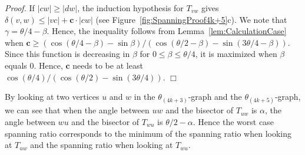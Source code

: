 \documentclass[12pt]{article}
\newenvironment{proof}{\emph{Proof.}}{\hfill $\Box$\\}
\newcommand{\graph}[1]{\ensuremath{\theta_{(4 k + #1)}}-graph\xspace}
\newcommand{\canon}[2]{\ensuremath{T_{#1 #2}}}
\newcommand{\const}{\ensuremath{\boldsymbol{c}}\xspace}
\begin{document}
\begin{proof}
  If $|c w| \geq |d w|$, the induction hypothesis for \canon{v}{w} gives $\delta(v, w) \leq |v c| + \const \cdot |c w|$ (see Figure~\ref{fig:SpanningProof4k+5}c). We note that $\gamma = \theta/4 - \beta$. Hence, the inequality follows from Lemma~\ref{lem:CalculationCase} when $\const \geq (\cos (\theta/4 - \beta) - \sin \beta) / (\cos (\theta/2 - \beta) - \sin (3\theta/4 - \beta))$. Since this function is decreasing in $\beta$ for $0 \leq \beta \leq \theta/4$, it is maximized when $\beta$ equals $0$. Hence, $\const$ needs to be at least $\cos (\theta/4) / (\cos (\theta/2) - \sin (3\theta/4))$.
\end{proof}

By looking at two vertices $u$ and $w$ in the \graph{3} and the \graph{5}, we can see that when the angle between $u w$ and the bisector of \canon{u}{w} is $\alpha$, the angle between $w u$ and the bisector of \canon{w}{u} is $\theta/2 - \alpha$. Hence the worst case spanning ratio corresponds to the minimum of the spanning ratio when looking at \canon{u}{w} and the spanning ratio when looking at \canon{w}{u}. 
\end{document}
